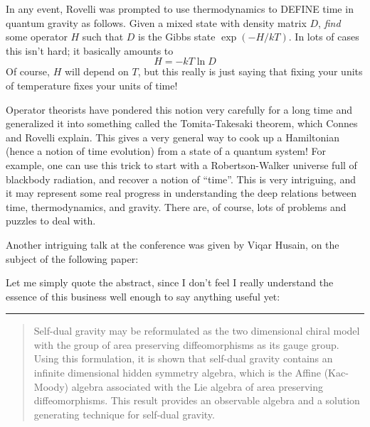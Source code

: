 \documentclass{article}
\def\tightlist{}
\renewcommand{\texttt}[1]{%
  \begingroup
  \ttfamily
  \begingroup\lccode`~=`/\lowercase{\endgroup\def~}{/\discretionary{}{}{}}%
  \begingroup\lccode`~=`[\lowercase{\endgroup\def~}{[\discretionary{}{}{}}%
  \begingroup\lccode`~=`.\lowercase{\endgroup\def~}{.\discretionary{}{}{}}%
  \catcode`/=\active\catcode`[=\active\catcode`.=\active
  \scantokens{#1\noexpand}%
  \endgroup
}
\begin{document}
In any event, Rovelli was prompted to use thermodynamics to DEFINE time
in quantum gravity as follows. Given a mixed state with density matrix
\(D\), \emph{find} some operator \(H\) such that \(D\) is the Gibbs
state \(\exp(-H/kT)\). In lots of cases this isn't hard; it basically
amounts to \[H = -kT \ln D\] Of course, \(H\) will depend on \(T\), but
this really is just saying that fixing your units of temperature fixes
your units of time!

Operator theorists have pondered this notion very carefully for a long
time and generalized it into something called the Tomita-Takesaki
theorem, which Connes and Rovelli explain. This gives a very general way
to cook up a Hamiltonian (hence a notion of time evolution) from a state
of a quantum system! For example, one can use this trick to start with a
Robertson-Walker universe full of blackbody radiation, and recover a
notion of ``time''. This is very intriguing, and it may represent some
real progress in understanding the deep relations between time,
thermodynamics, and gravity. There are, of course, lots of problems and
puzzles to deal with.

Another intriguing talk at the conference was given by Viqar Husain, on
the subject of the following paper:


Let me simply quote the abstract, since I don't feel I really understand
the essence of this business well enough to say anything useful yet:

\begin{center}\rule{0.5\linewidth}{0.5pt}\end{center}

\begin{quote}
Self-dual gravity may be reformulated as the two dimensional chiral
model with the group of area preserving diffeomorphisms as its gauge
group. Using this formulation, it is shown that self-dual gravity
contains an infinite dimensional hidden symmetry algebra, which is the
Affine (Kac-Moody) algebra associated with the Lie algebra of area
preserving diffeomorphisms. This result provides an observable algebra
and a solution generating technique for self-dual gravity.
\end{quote}
\end{document}
